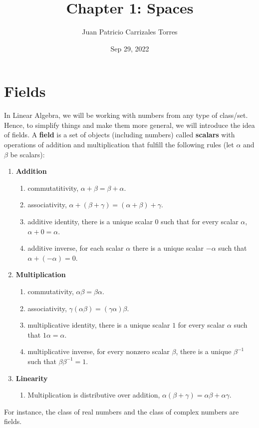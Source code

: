 \documentclass[12pt]{article}
\begin{document}
  
\title{Chapter 1: Spaces}
\author{Juan Patricio Carrizales Torres}
\date{Sep 29, 2022}
\maketitle
\section{Fields}

In Linear Algebra, we will be working with numbers from any type of class/set. Hence, to simplify things and make them more general, we will introduce the idea of fields. A \textbf{field} is a set of objects (including numbers) called \textbf{scalars} with operations of addition and multiplication that fulfill the following rules (let $\alpha$ and $\beta$ be scalars):
\begin{enumerate}
  \item \textbf{Addition}
\begin{enumerate}
  \item commutatitivity, $\alpha+\beta = \beta + \alpha$.
  \item associativity, $\alpha + (\beta + \gamma) = (\alpha + \beta) + \gamma$.
  \item additive identity, there is a unique scalar $0$ such that for every scalar $\alpha$, $\alpha + 0 = \alpha$.
  \item additive inverse, for each scalar $\alpha$ there is a unique scalar $-\alpha$ such that $\alpha + (- \alpha) = 0$.
\end{enumerate}
\item \textbf{Multiplication}
\begin{enumerate}
  \item commutativity, $\alpha\beta = \beta\alpha$.
  \item associativity, $\gamma(\alpha\beta) = (\gamma\alpha)\beta$.
  \item multiplicative identity, there is a unique scalar $1$ for every scalar $\alpha$ such that $1\alpha = \alpha$.
  \item multiplicative inverse, for every nonzero scalar $\beta$, there is a unique $\beta^{-1}$ such that $\beta\beta^{-1}=1$.
\end{enumerate}
\item \textbf{Linearity}
\begin{enumerate}
  \item Multiplication is distributive over addition, $\alpha(\beta + \gamma) = \alpha\beta + \alpha\gamma$.
\end{enumerate}
\end{enumerate}
For instance, the class of real numbers and the class of complex numbers are fields.
\end{document}
